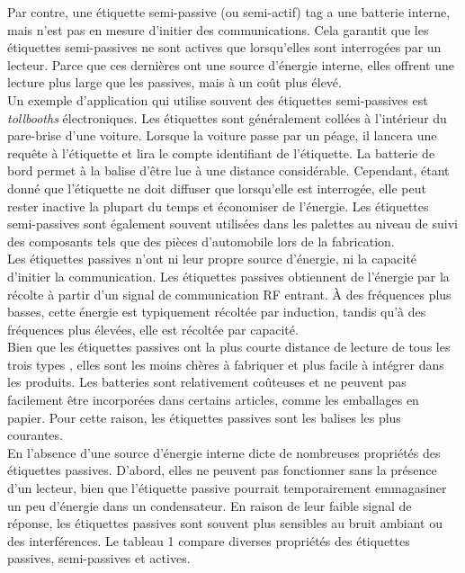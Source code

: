 \documentclass[11pt, a4paper, twoside]{book}
\begin{document}
Par contre, une étiquette semi-passive (ou semi-actif) tag a une batterie interne, mais n'est pas en mesure d'initier des communications. Cela garantit que les étiquettes semi-passives ne sont actives que lorsqu'elles sont interrogées par un lecteur. Parce que ces dernières ont une source d'énergie interne, elles offrent une lecture plus large que les passives, mais à un coût plus élevé.\\


Un exemple d'application qui utilise souvent des étiquettes semi-passives est \emph {tollbooths} électroniques. Les étiquettes sont généralement collées à l'intérieur du pare-brise d'une voiture. Lorsque la voiture passe par un péage, il lancera une requête à l'étiquette et lira le compte identifiant de l'étiquette. La batterie de bord permet à la balise d'être lue à une distance considérable. Cependant, étant donné que l'étiquette ne doit diffuser que lorsqu'elle est interrogée, elle peut rester inactive la plupart du temps et économiser de l'énergie. Les étiquettes semi-passives sont également souvent utilisées dans les palettes au niveau de suivi des composants tels que des pièces d'automobile lors de la fabrication.\\


Les étiquettes passives n'ont ni leur propre source d'énergie, ni la capacité d'initier la communication. Les étiquettes passives obtiennent de l'énergie par la récolte à partir d'un signal de communication RF entrant. À des fréquences plus basses, cette énergie est typiquement récoltée par induction, tandis qu'à des fréquences plus élevées, elle est récoltée par capacité.\\

Bien que les étiquettes passives ont la plus courte distance de lecture de tous les trois types , elles sont les moins chères à fabriquer et plus facile à intégrer dans les produits. Les batteries sont relativement coûteuses et ne peuvent pas facilement être incorporées dans certains articles, comme les emballages en papier. Pour cette raison, les étiquettes passives sont les balises les plus courantes.\\

En l'absence d'une source d'énergie interne dicte de nombreuses propriétés des étiquettes passives. D'abord, elles ne peuvent pas fonctionner sans la présence d'un lecteur, bien que l'étiquette passive pourrait temporairement emmagasiner  un peu d'énergie dans un condensateur. En raison de leur faible  signal de réponse, les étiquettes passives sont souvent plus sensibles au bruit ambiant ou des interférences. Le tableau 1 compare diverses propriétés des étiquettes passives, semi-passives et actives.\\
\end{document}
